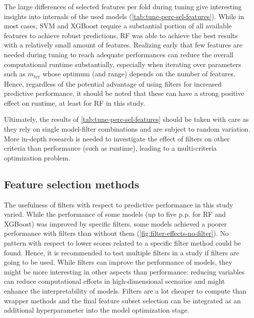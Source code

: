 \documentclass[peerreview]{IEEEtran}
\begin{document}
The large differences of selected features per fold during tuning give interesting insights into internals of the used models (\autoref{tab:tune-perc-sel-features}).
While in most cases, SVM and XGBoost require a substantial portion of all available features to achieve robust predictions, RF was able to achieve the best results with a relatively small amount of features.
Realizing early that few features are needed during tuning to reach adequate performances can reduce the overall computational runtime substantially, especially when iterating over parameters such as $m_\textrm{try}$ whose optimum (and range) depends on the number of features.
Hence, regardless of the potential advantage of using filters for increased predictive performance, it should be noted that these can have a strong positive effect on runtime, at least for RF in this study.

Ultimately, the results of \autoref{tab:tune-perc-sel-features} should be taken with care as they rely on single model-filter combinations and are subject to random variation.
More in-depth research is needed to investigate the effect of filters on other criteria than performance (such as runtime), leading to a multi-criteria optimization problem.

\subsection{Feature selection methods}

The usefulness of filters with respect to predictive performance in this study varied.
While the performance of some models (up to five p.p. for RF and XGBoost) was improved by specific filters, some models achieved a poorer performance with filters than without them (\autoref{fig:filter-effects-no-filter}).
No pattern with respect to lower scores related to a specific filter method could be found.
Hence, it is recommended to test multiple filters in a study if filters are going to be used.
While filters can improve the performance of models, they might be more interesting in other aspects than performance: reducing variables can reduce computational efforts in high-dimensional scenarios and might enhance the interpretability of models.
Filters are a lot cheaper to compute than wrapper methods and the final feature subset selection can be integrated as an additional hyperparameter into the model optimization stage.
\end{document}
